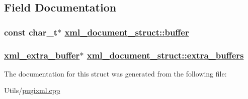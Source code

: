 \subsection{Field Documentation}
\hypertarget{structxml__document__struct_120451f29b8cc2a82a3ecc926449ea0e}{
\subsubsection[buffer]{\setlength{\rightskip}{0pt plus 5cm}const char\_\-t$\ast$ \hyperlink{structxml__document__struct_120451f29b8cc2a82a3ecc926449ea0e}{xml\_\-document\_\-struct::buffer}}}
\label{structxml__document__struct_120451f29b8cc2a82a3ecc926449ea0e}


\hypertarget{structxml__document__struct_fe3b1efd5b683c306157244496f55c4b}{
\subsubsection[extra\_\-buffers]{\setlength{\rightskip}{0pt plus 5cm}\hyperlink{structxml__extra__buffer}{xml\_\-extra\_\-buffer}$\ast$ \hyperlink{structxml__document__struct_fe3b1efd5b683c306157244496f55c4b}{xml\_\-document\_\-struct::extra\_\-buffers}}}
\label{structxml__document__struct_fe3b1efd5b683c306157244496f55c4b}




The documentation for this struct was generated from the following file:\begin{CompactItemize}
\item 
Utils/\hyperlink{pugixml_8cpp}{pugixml.cpp}\end{CompactItemize}
